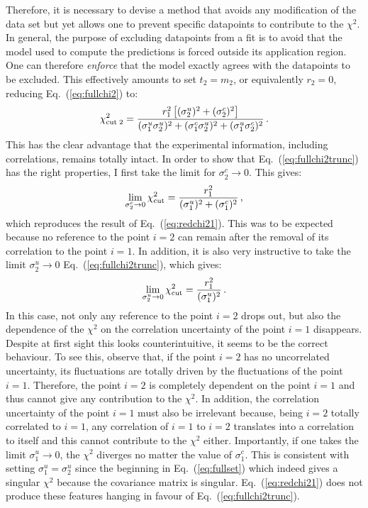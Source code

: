\documentclass[10pt,a4paper]{article}
\begin{document}
Therefore, it is necessary to devise a method that avoids any
modification of the data set but yet allows one to prevent specific
datapoints to contribute to the $\chi^2$. In general, the purpose of
excluding datapoints from a fit is to avoid that the model used to
compute the predictions is forced outside its application region. One
can therefore \textit{enforce} that the model exactly agrees with the
datapoints to be excluded. This effectively amounts to set $t_2=m_2$,
or equivalently $r_2=0$, reducing Eq.~(\ref{eq:fullchi2}) to:
\begin{equation}\label{eq:fullchi2trunc}
  \chi_{\rm cut\;2}^2= 
  \frac{r_1^2\left[(\sigma_2^u)^2+ (\sigma_2^c)^2\right]}{(\sigma_1^u \sigma_2^u)^2+ (\sigma_1^c \sigma_2^u)^2+ (\sigma_1^u \sigma_2^c)^2}\,.
\end{equation}
This has the clear advantage that the experimental information,
including correlations, remains totally intact. In order to show that
Eq.~(\ref{eq:fullchi2trunc}) has the right properties, I first take
the limit for $\sigma_2^c\rightarrow 0$. This gives:
\begin{equation}
  \lim_{\sigma_2^c\rightarrow 0}\chi_{\rm cut}^2= 
  \frac{r_1^2}{(\sigma_1^u)^2+ (\sigma_1^c)^2}\,,
\end{equation}
which reproduces the result of Eq.~(\ref{eq:redchi21}). This was to be
expected because no reference to the point $i=2$ can remain after the
removal of its correlation to the point $i=1$. In addition, it is also
very instructive to take the limit $\sigma_2^u\rightarrow 0$
Eq.~(\ref{eq:fullchi2trunc}), which gives:
\begin{equation}
\lim_{\sigma_2^u\rightarrow 0}\chi_{\rm cut}^2= 
\frac{r_1^2}{ (\sigma_1^u)^2}\,.
\end{equation}
In this case, not only any reference to the point $i=2$ drops out, but
also the dependence of the $\chi^2$ on the correlation uncertainty of
the point $i=1$ disappears. Despite at first sight this looks
counterintuitive, it seems to be the correct behaviour. To see this,
observe that, if the point $i=2$ has no uncorrelated uncertainty, its
fluctuations are totally driven by the fluctuations of the point
$i=1$. Therefore, the point $i=2$ is completely dependent on the point
$i=1$ and thus cannot give any contribution to the $\chi^2$. In
addition, the correlation uncertainty of the point $i=1$ must also be
irrelevant because, being $i=2$ totally correlated to $i=1$, any
correlation of $i=1$ to $i=2$ translates into a correlation to itself
and this cannot contribute to the $\chi^2$ either. Importantly, if one
takes the limit $\sigma_1^u\rightarrow 0$, the $\chi^2$ diverges no
matter the value of $\sigma_1^c$. This is consistent with setting
$\sigma_1^u=\sigma_2^u$ since the beginning in Eq.~(\ref{eq:fullset})
which indeed gives a singular $\chi^2$ because the covariance matrix
is singular. Eq.~(\ref{eq:redchi21}) does not produce these features
hanging in favour of Eq.~(\ref{eq:fullchi2trunc}).
\end{document}
